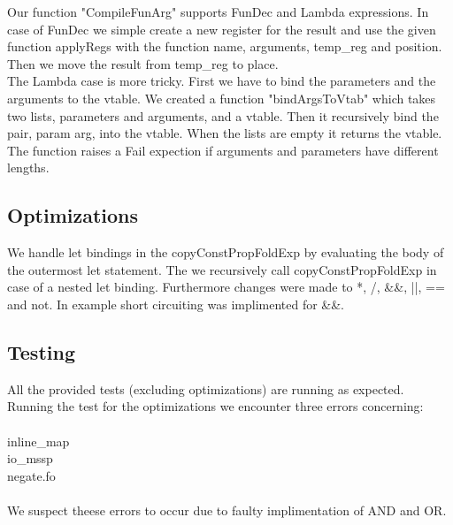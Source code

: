 \documentclass[12pt]{article}
\numberwithin{listing}{section}
\begin{document}
Our function "CompileFunArg" supports FunDec and Lambda expressions. In case of FunDec we simple create a new register for the result and use the given function applyRegs with the function name, arguments, temp\_reg and position. Then we move the result from temp\_reg to place.\\
The Lambda case is more tricky. First we have to bind the parameters and the arguments to the vtable. We created a function "bindArgsToVtab" which takes two lists, parameters and arguments, and a vtable. Then it recursively bind the pair, param arg, into the vtable. When the lists are empty it returns the vtable. The function raises a Fail expection if arguments and parameters have different lengths.

\subsection*{Optimizations}
We handle let bindings in the copyConstPropFoldExp by evaluating the body of the outermost let statement. The we recursively call copyConstPropFoldExp in case of a nested let binding. Furthermore changes were made to *, /, \&\&, ||, == and not. In example short circuiting was implimented for \&\&.

\subsection*{Testing}
All the provided tests (excluding optimizations) are running as expected. Running the test for the optimizations we encounter three errors concerning:
\\\\ inline\_map \\ io\_mssp \\ negate.fo \\\\
We suspect theese errors to occur due to faulty implimentation of AND and OR.




%
\end{document}
